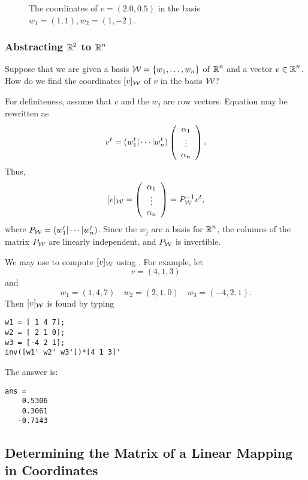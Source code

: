 \documentclass{ximera}
\begin{document}
\begin{figure}[htb]
     \centerline{%
     }
     \caption{The coordinates of $v=(2.0,0.5)$ in the basis
	$w_1=(1,1), w_2=(1,-2)$.}
     \label{F:coords}
\end{figure}

\subsubsection*{Abstracting $\mbox{$\Bbb{R}$}^2$ to $\mbox{$\Bbb{R}$}^n$}

Suppose that we are given a basis ${\cal W} = \{w_1,\ldots,w_n\}$ of
$\mbox{$\Bbb{R}$}^n$ and a vector $v\in\mbox{$\Bbb{R}$}^n$.  How do we find the coordinates
$[v]_{\cal W}$ of $v$ in the basis ${\cal W}$?

For definiteness, assume that $v$ and the $w_j$ are row vectors.  Equation
 may be rewritten as
\[
v^t = (w_1^t|\cdots|w_n^t)\left(\begin{array}{c} \alpha_1 \\ \vdots \\ \alpha_{n}\end{array}\right).
\]
Thus,
\begin{equation}  \label{e:coordRn}
[v]_{\cal W} = \left(\begin{array}{c} \alpha_1 \\ \vdots \\ \alpha_{n}\end{array}\right) = P_{\cal W}^{-1} v^t,
\end{equation}
where $P_{\cal W} = (w_1^t|\cdots|w_n^t)$.  Since the $w_j$ are a basis for
$\mbox{$\Bbb{R}$}^n$, the columns of the matrix $P_{\cal W}$ are linearly independent, and
$P_{\cal W}$ is invertible.


We may use  to compute $[v]_{\cal W}$ using
\Matlabp.  For example, let
\[
v  =  (4,1,3)
\]
and
\[
w_1 =  (1,4,7) \quad w_2 = (2,1,0) \quad w_3 = (-4,2,1).
\]
Then $[v]_{\cal W}$ is found by typing
\begin{verbatim}
w1 = [ 1 4 7];
w2 = [ 2 1 0];
w3 = [-4 2 1];
inv([w1' w2' w3'])*[4 1 3]'
\end{verbatim}   
The answer is:

\begin{verbatim}
ans =
    0.5306
    0.3061
   -0.7143
\end{verbatim}


\subsection*{Determining the Matrix of a Linear Mapping in Coordinates}
\end{document}
